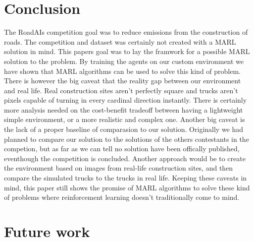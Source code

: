 \documentclass[conference]{IEEEtran}
\begin{document}
\section{Conclusion}
The RoadAIs competition goal was to reduce \coo{} emissions from the construction of roads.
The competition and dataset was certainly not created with a MARL solution in mind.
This papers goal was to lay the framwork for a possible MARL solution to the problem.
By training the agents on our custom environment we have shown that MARL algorithms can be used to solve this  kind of problem.
There is however the big caveat that the reality gap between our environment and real life.
Real construction sites aren't perfectly square and trucks aren't pixels capable of turning in every cardinal direction instantly. There is certainly more analysis needed on the cost-benefit tradeoff between having a lightweight simple environment, or a more realistic and complex one.
Another big caveat is the lack of a proper baseline of comparasion to our solution.
Originally we had planned to compare our solution to the solutions of the others contestants in the competion, but as far as we can tell no solution have been offically published, eventhough the competition is concluded.
Another approach would be to create the environment based on images from real-life construction sites, and then
compare the simulated trucks to the trucks in real life.
Keeping these caveats in mind, this paper still shows the promise of MARL algorithms to solve these kind of
problems where reinforcement learning doesn't traditionally come to mind.



\section{Future work}
\end{document}
